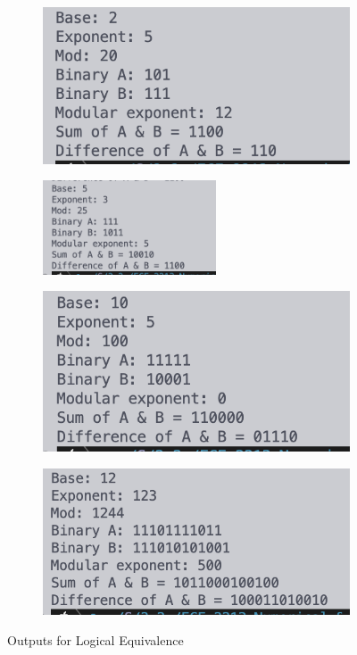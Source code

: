 \begin{figure}[H]
    \begin{subfigure}{.5\textwidth}
        \centering
        \includegraphics[width=.8\linewidth]{images/output/int1.png}
        \caption*{}
        \label{fig:int1}
    \end{subfigure}
    \begin{subfigure}{.5\textwidth}
        \centering
        \includegraphics[width=.8\linewidth, height=1.1in]{images/output/int2.png}
        \caption*{}
        \label{fig:int2}
    \end{subfigure}
    \begin{subfigure}{.5\textwidth}
        \centering
        \includegraphics[width=.8\linewidth,]{images/output/int3.png}
        \caption*{}
        \label{fig:int3}
    \end{subfigure}
    \begin{subfigure}{.5\textwidth}
        \centering
        \includegraphics[width=.8\linewidth]{images/output/int4.png}
        \caption*{}
        \label{fig:int4}
    \end{subfigure}
    \caption{Outputs for Logical Equivalence}
    \label{fig:int}
\end{figure}